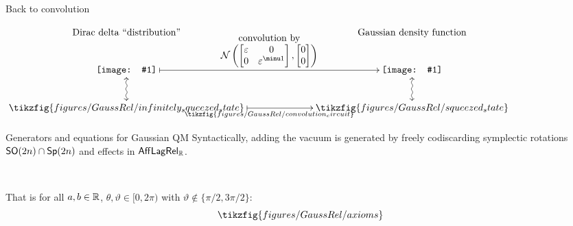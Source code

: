 \documentclass{beamer}
\newcommand{\vcenteredincludenew}[1]{\begingroup
\setbox0=\hbox{\texttt{[image: \#1]}}%
\parbox{\wd0}{\box0}\endgroup}
\begin{document}
\begin{frame}{Back to convolution}




\hspace*{-.75cm}
\(
\displaystyle
\xymatrix@R+0pc@C+3.7pc{
\text{Dirac delta ``distribution''} & \text{Gaussian density function}\\
{\vcenteredincludenew{scripts/dirac_delta.png}} \ar@{|->}[r]^{\begin{matrix}\text{convolution by}\\ \mathcal{N}\left(\begin{bmatrix} \epsilon & 0\\ 0 & \epsilon^{\minu 1} \end{bmatrix}, \begin{bmatrix} 0 \\ 0 \end{bmatrix} \right) \end{matrix}} \ar@{<~>}[d]&
{\vcenteredincludenew{scripts/finitely_squeezed.png}}\ar@{<~>}[d] \\
\tikzfig{figures/GaussRel/infinitely_squeezed_state} \ar@{|->}[r]_{\tikzfig{figures/GaussRel/convolution_circuit}}&
\tikzfig{figures/GaussRel/squeezed_state}
}
\)

\end{frame}



\begin{frame}{Generators and equations for Gaussian QM}
Syntactically, adding the vacuum is  generated by freely codiscarding symplectic rotations \({\sf SO}(2n)\cap{\sf Sp}(2n)\) and effects in \(\ALR[\R]\).

\

That is for all \(a,b \in \mathbb{R}\), \(\theta, \vartheta \in [0,2\pi)\) with \(\vartheta\notin \{\pi/2,3\pi/2\}\):
\[\tikzfig{figures/GaussRel/axioms}\]
\end{frame}
\end{document}
